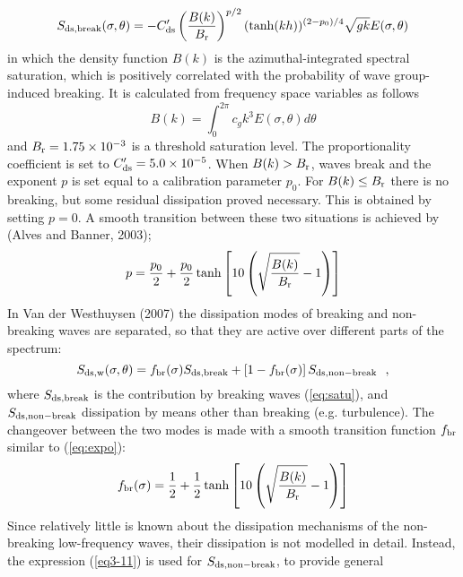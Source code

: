 \documentclass[12pt]{book}
\begin{document}
\begin{equation}
  S_{\rm ds,break} (\sigma,\theta) = -C'_{\rm ds} \left( \frac{B(k)}{B_{\rm r}} \right)^{p/2} (\tanh(kh))^{(2-p_0)/4}
                                  \sqrt{gk} E(\sigma,\theta)
  \label{eq:satu}
\end{equation}
in which the density function $B(k)$ is the azimuthal-integrated spectral saturation, which is positively correlated with
the probability of wave group-induced breaking. It is calculated from frequency space variables as follows
\begin{equation}
  B(k) = \int_{0}^{2\pi} c_g k^3 E(\sigma,\theta) d\theta
\end{equation}
and $B_{\rm r} = 1.75 \times 10^{-3}$ is a threshold saturation level. The proportionality coefficient is set to
$C'_{\rm ds} = 5.0 \times 10^{-5}$. When $B(k) > B_{\rm r}$, waves break and the exponent $p$ is set equal
to a calibration parameter $p_0$. For $B(k) \leq B_{\rm r}$ there is no breaking, but some residual dissipation proved
necessary. This is obtained by setting $p = 0$. A smooth transition between these two situations is achieved by
(Alves and Banner, 2003);
\begin{equation}
  p = \frac{p_0}{2} + \frac{p_0}{2} \tanh \left[ 10 \left( \sqrt{\frac{B(k)}{B_{\rm r}}} - 1 \right) \right]
  \label{eq:expo}
\end{equation}
\noindent
In Van der Westhuysen (2007) the dissipation modes of breaking and non-breaking waves are separated, so that they
are active over different parts of the spectrum:
\begin{equation}
  S_{\rm ds,w}(\sigma,\theta) = f_{\rm br}(\sigma)S_{\rm ds,break} + \left[ 1 - f_{\rm br}(\sigma) \right]
  S_{\rm ds,non-break} \ \ ,
  \label{eq:wctot}
\end{equation}
\noindent
where $S_{\rm ds,break}$ is the contribution by breaking waves (\ref{eq:satu}), and $S_{\rm ds,non-break}$ dissipation
by means other than breaking (e.g. turbulence). The changeover between the two modes is made with a smooth transition
function $f_{\rm br}$ similar to (\ref{eq:expo}):
\begin{equation}
  f_{\rm br}(\sigma) = \frac{1}{2} + \frac{1}{2} \tanh \left[ 10 \left( \sqrt{\frac{B(k)}{B_{\rm r}}} - 1 \right) \right]
  \label{eq:fbr}
\end{equation}
\noindent
Since relatively little is known about the dissipation mechanisms of the non-breaking low-frequency waves, their dissipation
is not modelled in detail. Instead, the expression (\ref{eq3-11}) is used for $S_{\rm ds,non-break}$, to provide general
\end{document}
